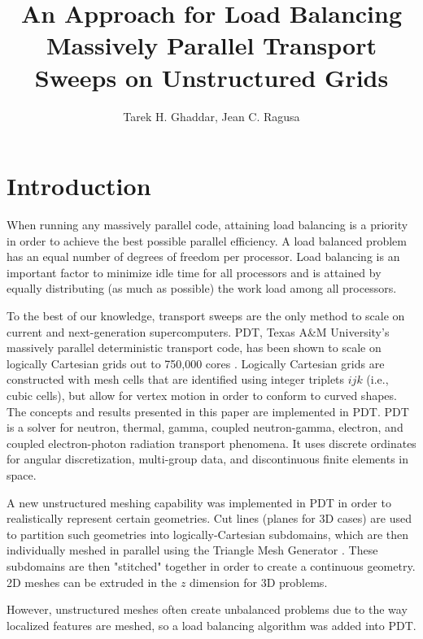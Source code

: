 \documentclass{anstrans}
\title{An Approach for Load Balancing Massively Parallel Transport Sweeps on Unstructured Grids}
\author{Tarek H. Ghaddar, Jean C. Ragusa}
\institute{
Dept. of Nuclear Engineering, Texas A\&M University, College Station, TX, 77843-3133
\and

}
\begin{document}
\section{Introduction}
\label{ch:introduction}
When running any massively parallel code, attaining load balancing is a priority in order to achieve the best possible parallel efficiency. A load balanced problem has an equal number of degrees of freedom per processor. Load balancing is an important factor to minimize idle time for all processors and is attained by equally distributing (as much as possible) the work load among all processors. 

To the best of our knowledge, transport sweeps are the only method to scale on current and next-generation supercomputers. PDT, Texas A\&M University's massively parallel deterministic transport code, has been shown to scale on logically Cartesian grids out to 750,000 cores \cite{mpadams2015}. Logically Cartesian grids are constructed with mesh cells that are identified using integer triplets $ijk$ (i.e., cubic cells), but allow for vertex motion in order to conform to curved shapes. The concepts and results presented in this paper are implemented in PDT. PDT is a solver for neutron, thermal, gamma, coupled neutron-gamma, electron, and coupled electron-photon radiation transport phenomena. It uses discrete ordinates for angular discretization, multi-group data, and discontinuous finite elements in space. 

A new unstructured meshing capability was implemented in PDT in order to realistically represent certain geometries. Cut lines (planes for 3D cases) are used to partition such geometries into logically-Cartesian subdomains, which are then individually meshed in parallel using the Triangle Mesh Generator \cite{triangle}. These subdomains are then "stitched" together in order to create a continuous geometry. 2D meshes can be extruded in the $z$ dimension for 3D problems. 

However, unstructured meshes often create unbalanced problems due to the way localized features are meshed, so a load balancing algorithm was added into PDT. 

\end{document}
